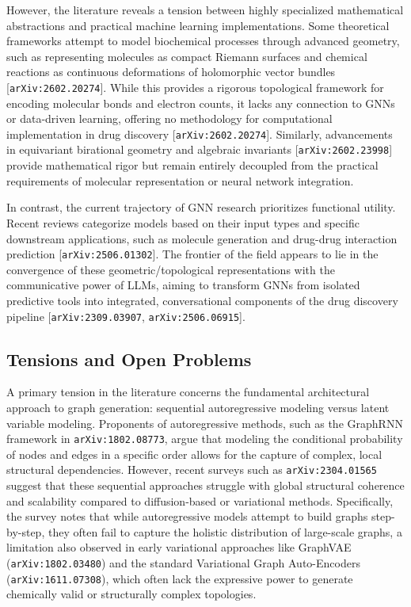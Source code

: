 \documentclass[11pt]{article}
\begin{document}
However, the literature reveals a tension between highly specialized mathematical abstractions and practical machine learning implementations. Some theoretical frameworks attempt to model biochemical processes through advanced geometry, such as representing molecules as compact Riemann surfaces and chemical reactions as continuous deformations of holomorphic vector bundles [\texttt{arXiv:2602.20274}]. While this provides a rigorous topological framework for encoding molecular bonds and electron counts, it lacks any connection to GNNs or data-driven learning, offering no methodology for computational implementation in drug discovery [\texttt{arXiv:2602.20274}]. Similarly, advancements in equivariant birational geometry and algebraic invariants [\texttt{arXiv:2602.23998}] provide mathematical rigor but remain entirely decoupled from the practical requirements of molecular representation or neural network integration.

In contrast, the current trajectory of GNN research prioritizes functional utility. Recent reviews categorize models based on their input types and specific downstream applications, such as molecule generation and drug-drug interaction prediction [\texttt{arXiv:2506.01302}]. The frontier of the field appears to lie in the convergence of these geometric/topological representations with the communicative power of LLMs, aiming to transform GNNs from isolated predictive tools into integrated, conversational components of the drug discovery pipeline [\texttt{arXiv:2309.03907}, \texttt{arXiv:2506.06915}].

\subsection{Tensions and Open Problems}

A primary tension in the literature concerns the fundamental architectural approach to graph generation: sequential autoregressive modeling versus latent variable modeling. Proponents of autoregressive methods, such as the GraphRNN framework in \texttt{arXiv:1802.08773}, argue that modeling the conditional probability of nodes and edges in a specific order allows for the capture of complex, local structural dependencies. However, recent surveys such as \texttt{arXiv:2304.01565} suggest that these sequential approaches struggle with global structural coherence and scalability compared to diffusion-based or variational methods. Specifically, the survey notes that while autoregressive models attempt to build graphs step-by-step, they often fail to capture the holistic distribution of large-scale graphs, a limitation also observed in early variational approaches like GraphVAE (\texttt{arXiv:1802.03480}) and the standard Variational Graph Auto-Encoders (\texttt{arXiv:1611.07308}), which often lack the expressive power to generate chemically valid or structurally complex topologies.
\end{document}
